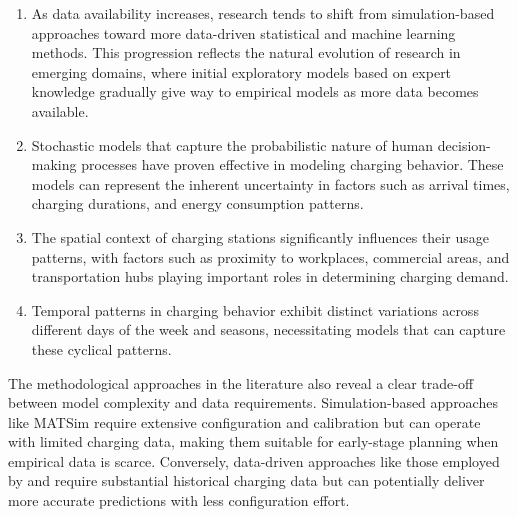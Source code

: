 \begin{enumerate}
    \item As data availability increases, research tends to shift from simulation-based approaches toward more data-driven statistical and machine learning methods. This progression reflects the natural evolution of research in emerging domains, where initial exploratory models based on expert knowledge gradually give way to empirical models as more data becomes available.

    \item Stochastic models that capture the probabilistic nature of human decision-making processes have proven effective in modeling charging behavior. These models can represent the inherent uncertainty in factors such as arrival times, charging durations, and energy consumption patterns.

    \item The spatial context of charging stations significantly influences their usage patterns, with factors such as proximity to workplaces, commercial areas, and transportation hubs playing important roles in determining charging demand.

    \item Temporal patterns in charging behavior exhibit distinct variations across different days of the week and seasons, necessitating models that can capture these cyclical patterns.
\end{enumerate}

The methodological approaches in the literature also reveal a clear trade-off between model complexity and data requirements. Simulation-based approaches like MATSim require extensive configuration and calibration but can operate with limited charging data, making them suitable for early-stage planning when empirical data is scarce. Conversely, data-driven approaches like those employed by \cite{powellScalableProbabilisticEstimates2022} and \cite{hechtGlobalElectricVehicle2024} require substantial historical charging data but can potentially deliver more accurate predictions with less configuration effort.
